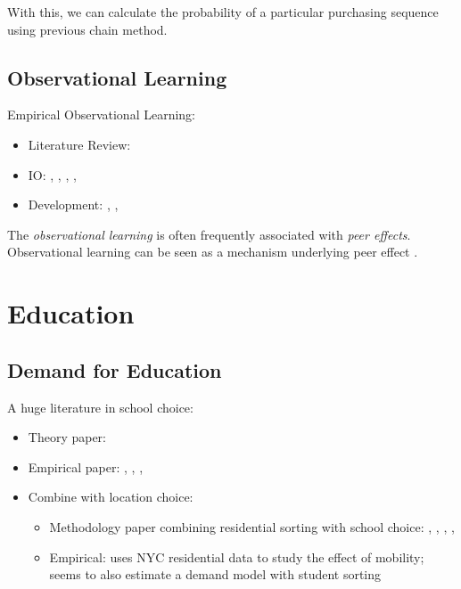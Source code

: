 With this, we can calculate the probability of a particular purchasing sequence using previous chain method.





\chapter{Observational Learning} %
\label{cha:observational_learning}

Empirical Observational Learning:
\begin{itemize}
    \item Literature Review: \textcite{Sorensen2017}
    \item IO: \textcite{Moretti2011}, \textcite{HendricksSorensenWiseman2012}, \textcite{Newberry2016}, \textcite{LiWu2019}, \textcite{HollenbeckMoorthyProserpio2019}
    \item Development: \textcite{BobonisFinan2009}, \textcite*{AngelucciDeGiorgiRangelEtAl2010}, \textcite*{BursztynEdererFermanEtAl2014}
\end{itemize}

The \textit{observational learning} is often frequently associated with \textit{peer effects}.
Observational learning can be seen as a mechanism underlying peer effect \citep{BursztynEdererFermanEtAl2014}.



\part{Education}

\chapter{Demand for Education}

A huge literature in school choice:
\begin{itemize}
    \item Theory paper: \textcite{BarseghyanClarkCoate2019}
    \item Empirical paper: \citet{HastingsKaneStaiger2009}, \citet*{DemingHastingsKaneEtAl2014}, \citet*{BurgessGreavesVignolesEtAl2015}, \textcite{Walters2018}
    \item Combine with location choice:   
    \begin{itemize}
        \item Methodology paper combining residential sorting with school choice: \textcite{Rothstein2006}, \textcite{BayerTimmins2007}, \textcite{BayerFerreiraMcMillan2007}, \textcite{BayerMcMillan2010}, \Textcite{BayerMcMillanMurphyEtAl2016}
        \item Empirical: \textcite{CordesSchwartzStiefel2019} uses NYC residential data to study the effect of mobility; \citet{EppleJhaSieg2018} seems to also estimate a demand model with student sorting
    \end{itemize}
\end{itemize}

